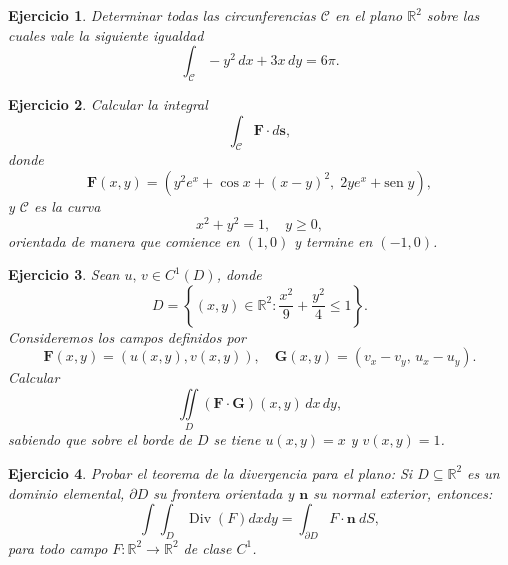 \documentclass[11pt,a4paper,pdftex]{amsart}
\newtheorem{ej}{Ejercicio}%
\numberwithin{equation}{section}%
\newcommand{\bej}[1]{\begin{ej}\rm{#1}}
\newcommand{\eej}{\end{ej}\vspace{-0.2cm}}
\newcommand{\C}{\mathcal C}
\newcommand{\R}{\mathbb R}
\newcommand{\0}{\mathbb O}
\newcommand{\8}{\infty}
\newcommand{\sen}[1]{\mbox{sen}\;{#1}}
\begin{document}
\bej
Determinar todas las circunferencias \(\C\) en el plano \(\R^2\) sobre las cuales vale la siguiente igualdad
\[
\int_\C -y^2 \, dx + 3x \, dy = 6\pi.
\]
\eej

\bej
Calcular la integral
\[
\int_\C \textbf{F}\cdot d\textbf{s},
\]
donde
\[
\textbf{F}(x,y)=(y^2e^x+\cos x+(x-y)^2,\;2ye^x+\sen y),
\]
y \(\C\) es la curva
\[
x^2+y^2=1,\quad y\ge 0,
\]
orientada de manera que comience en \((1,0)\) y termine en \((-1,0)\).
\eej

\bej
Sean \(u,\,v \in C^{1}(D)\), donde
\[
D=\left\{(x,y)\in \R^2 : \frac{x^2}{9}+\frac{y^2}{4} \leq1\right\}.
\]
Consideremos los campos definidos por
\[
\textbf{F}(x,y)=(u(x,y),v(x,y)),\quad \textbf{G}(x,y)=(v_{x} -v_{y},\,u_{x} -u_{y}).
\]
Calcular
\[
\iint\limits_{D} (\textbf{F} \cdot \textbf{G})(x,y) \,dx\,dy,
\]
sabiendo que sobre el borde de \(D\) se tiene \(u(x,y)=x\) y \(v(x,y)=1\).
\eej

\bej
Probar el teorema de la divergencia para el plano: Si $D \subseteq \mathbb{R}^2$ es un dominio elemental, $\partial D$ su frontera orientada y $\textbf{n}$ su normal exterior, entonces:
\begin{equation*}
    \int\int_{D} \operatorname{Div}(F)dxdy = \int_{\partial D} F \cdot \textbf{n} \ dS,
\end{equation*}
para todo campo $F:\mathbb{R}^2\rightarrow \mathbb{R}^2$ de clase $C^1$.  
\eej
\end{document}
